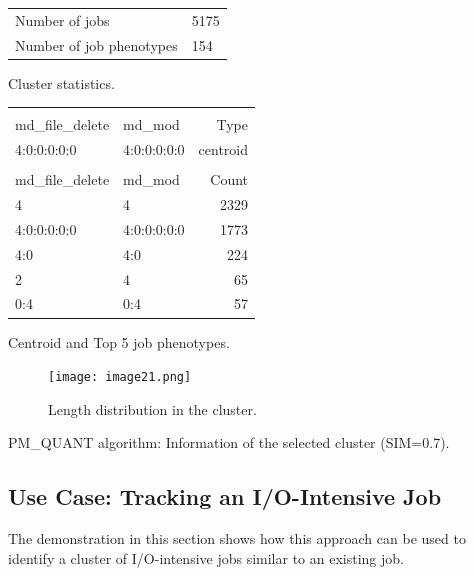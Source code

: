\documentclass{jhps}
\begin{document}
\begin{cluster}
	\begin{subtable}{\textwidth}
	 \centering
	 \begin{tabular}{ll}
		 Number of jobs & 5175 \\
		 Number of job phenotypes & 154 \\
	 \end{tabular}
	 \caption{Cluster statistics.}
	 \label{cluster:pm_quant:stats}
	\end{subtable}
	\medskip
	\begin{subtable}{\textwidth}
	 \centering
	 \begin{tiny}
		 \begin{tabular}{ll|r}
			 \rowcolor{tblhead}
			 \multicolumn{2}{l|}{Hexadecimal coding} &              \\
			 \rowcolor{tblhead}
			 md\_file\_delete     &  md\_mod     & Type     \\
			 \hline
			 4:0:0:0:0:0          &  4:0:0:0:0:0 & centroid \\
			 \multicolumn{3}{l}{} \\
			 \rowcolor{tblhead}
			 md\_file\_delete     &  md\_mod     & Count    \\
			 \hline
			 4                    &  4           & 2329     \\
			 4:0:0:0:0:0          &  4:0:0:0:0:0 & 1773     \\
			 4:0                  &  4:0         & 224      \\
			 2                    &  4           & 65       \\
			 0:4                  &  0:4         & 57       \\
		 \end{tabular}
	 \end{tiny}
	 \caption{Centroid and Top 5 job phenotypes.}
	 \label{cluster:pm_quant:top_jobs}
	\end{subtable}
	\medskip
	\begin{subfigure}{\textwidth}
		\centering
		\texttt{[image: image21.png]}
		\caption{Length distribution in the cluster.}
		\label{cluster:pm_quant:length}
	\end{subfigure}
	\caption{PM\_QUANT algorithm: Information of the selected cluster (SIM=0.7).}
	\label{cluster:pm_quant}
\end{cluster}

\FloatBarrier
\subsection{Use Case: Tracking an I/O-Intensive Job}
The demonstration in this section shows how this approach can be used to identify a cluster of I/O-intensive jobs similar to an existing job.
\end{document}
